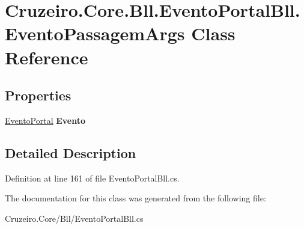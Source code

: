 \hypertarget{class_cruzeiro_1_1_core_1_1_bll_1_1_evento_portal_bll_1_1_evento_passagem_args}{}\section{Cruzeiro.\+Core.\+Bll.\+Evento\+Portal\+Bll.\+Evento\+Passagem\+Args Class Reference}
\label{class_cruzeiro_1_1_core_1_1_bll_1_1_evento_portal_bll_1_1_evento_passagem_args}
\subsection*{Properties}
\begin{DoxyCompactItemize}
\item 
\hyperlink{class_cruzeiro_1_1_core_1_1_model_1_1_evento_portal}{Evento\+Portal} {\bfseries Evento}\hypertarget{class_cruzeiro_1_1_core_1_1_bll_1_1_evento_portal_bll_1_1_evento_passagem_args_a0d7ba4b49722fe1da178a784bde29eeb}{}\label{class_cruzeiro_1_1_core_1_1_bll_1_1_evento_portal_bll_1_1_evento_passagem_args_a0d7ba4b49722fe1da178a784bde29eeb}

\end{DoxyCompactItemize}


\subsection{Detailed Description}


Definition at line 161 of file Evento\+Portal\+Bll.\+cs.



The documentation for this class was generated from the following file\+:\begin{DoxyCompactItemize}
\item 
Cruzeiro.\+Core/\+Bll/Evento\+Portal\+Bll.\+cs\end{DoxyCompactItemize}
